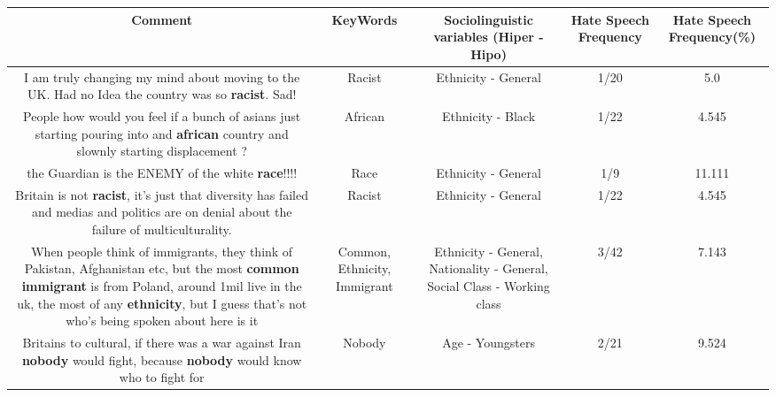 \documentclass[11pt]{article}
\newlength\mylength
\begin{document}
\begin{center}
\setlength\mylength{\dimexpr\textwidth - 1\arrayrulewidth - 50\tabcolsep}
\begin{longtable}{|C{.65\mylength}|C{.30\mylength}|C{.12\mylength}|C{.12\mylength}|C{.12\mylength}|}
\hline
\textbf{Comment} & \textbf{KeyWords} & \textbf{Sociolinguistic variables (Hiper - Hipo)}  & \textbf{Hate Speech Frequency} & \textbf{Hate Speech Frequency(\%)} \\
\hline{}\small I am truly changing my mind about moving to the UK. Had no Idea the country was so \textbf{racist}. Sad!\normalsize   & Racist & Ethnicity - General & 1/20 & 5.0 \\  \hline
  \small People how would you feel if a bunch of asians just starting pouring into and \textbf{african} country and slownly starting displacement ?\normalsize   & African & Ethnicity - Black & 1/22 & 4.545 \\  \hline
  \small the Guardian is the ENEMY of the white \textbf{race}!!!!\normalsize   & Race & Ethnicity - General & 1/9 & 11.111 \\  \hline
  \small Britain is not \textbf{racist}, it's just that diversity has failed and medias and politics are on denial about the failure of multiculturality.\normalsize   & Racist & Ethnicity - General & 1/22 & 4.545 \\  \hline
  \small When people think of immigrants, they think of Pakistan, Afghanistan etc, but the most \textbf{common} \textbf{immigrant} is from Poland, around 1mil live in the uk, the most of any \textbf{ethnicity}, but I guess that's not who's being spoken about here is it\normalsize   & Common, Ethnicity, Immigrant & Ethnicity - General, Nationality - General, Social Class - Working class & 3/42 & 7.143 \\  \hline
  \small Britains to cultural, if there was a war against Iran \textbf{nobody} would fight, because \textbf{nobody} would know who to fight for\normalsize   & Nobody & Age - Youngsters & 2/21 & 9.524 \\  \hline

\end{longtable}
\end{center}
\end{document}
